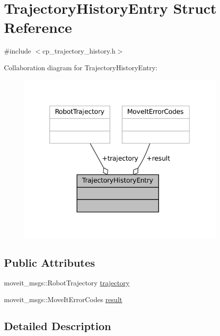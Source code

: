 \hypertarget{structTrajectoryHistoryEntry}{}\section{Trajectory\+History\+Entry Struct Reference}
\label{structTrajectoryHistoryEntry}


{\ttfamily \#include $<$cp\+\_\+trajectory\+\_\+history.\+h$>$}



Collaboration diagram for Trajectory\+History\+Entry\+:
\nopagebreak
\begin{figure}[H]
\begin{center}
\leavevmode
\includegraphics[width=294pt]{structTrajectoryHistoryEntry__coll__graph}
\end{center}
\end{figure}
\subsection*{Public Attributes}
\begin{DoxyCompactItemize}
\item 
moveit\+\_\+msgs\+::\+Robot\+Trajectory \hyperlink{structTrajectoryHistoryEntry_a96ea80c78bed18a8688936d70281b796}{trajectory}
\item 
moveit\+\_\+msgs\+::\+Move\+It\+Error\+Codes \hyperlink{structTrajectoryHistoryEntry_a64778e06b3e8d83cbf61909c6eb9b561}{result}
\end{DoxyCompactItemize}


\subsection{Detailed Description}



